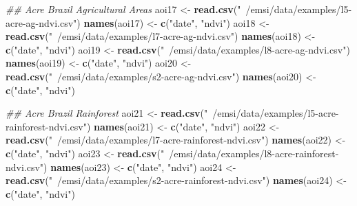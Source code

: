 \documentclass[
]{article}
\newenvironment{Shaded}{\begin{snugshade}}{\end{snugshade}}
\newcommand{\CommentTok}[1]{\textcolor[rgb]{0.56,0.35,0.01}{\textit{#1}}}
\newcommand{\KeywordTok}[1]{\textcolor[rgb]{0.13,0.29,0.53}{\textbf{#1}}}
\newcommand{\NormalTok}[1]{#1}
\newcommand{\StringTok}[1]{\textcolor[rgb]{0.31,0.60,0.02}{#1}}
\begin{document}
\begin{Shaded}
\begin{Highlighting}[]
\CommentTok{## Acre Brazil Agricultural Areas}
\NormalTok{aoi17 <-}\StringTok{ }\KeywordTok{read.csv}\NormalTok{(}\StringTok{"~/emsi/data/examples/l5-acre-ag-ndvi.csv"}\NormalTok{)}
\KeywordTok{names}\NormalTok{(aoi17) <-}\StringTok{ }\KeywordTok{c}\NormalTok{(}\StringTok{"date"}\NormalTok{, }\StringTok{"ndvi"}\NormalTok{)}
\NormalTok{aoi18 <-}\StringTok{ }\KeywordTok{read.csv}\NormalTok{(}\StringTok{"~/emsi/data/examples/l7-acre-ag-ndvi.csv"}\NormalTok{)}
\KeywordTok{names}\NormalTok{(aoi18) <-}\StringTok{ }\KeywordTok{c}\NormalTok{(}\StringTok{"date"}\NormalTok{, }\StringTok{"ndvi"}\NormalTok{)}
\NormalTok{aoi19 <-}\StringTok{ }\KeywordTok{read.csv}\NormalTok{(}\StringTok{"~/emsi/data/examples/l8-acre-ag-ndvi.csv"}\NormalTok{)}
\KeywordTok{names}\NormalTok{(aoi19) <-}\StringTok{ }\KeywordTok{c}\NormalTok{(}\StringTok{"date"}\NormalTok{, }\StringTok{"ndvi"}\NormalTok{)}
\NormalTok{aoi20 <-}\StringTok{ }\KeywordTok{read.csv}\NormalTok{(}\StringTok{"~/emsi/data/examples/s2-acre-ag-ndvi.csv"}\NormalTok{)}
\KeywordTok{names}\NormalTok{(aoi20) <-}\StringTok{ }\KeywordTok{c}\NormalTok{(}\StringTok{"date"}\NormalTok{, }\StringTok{"ndvi"}\NormalTok{)}

\CommentTok{## Acre Brazil Rainforest}
\NormalTok{aoi21 <-}\StringTok{ }\KeywordTok{read.csv}\NormalTok{(}\StringTok{"~/emsi/data/examples/l5-acre-rainforest-ndvi.csv"}\NormalTok{)}
\KeywordTok{names}\NormalTok{(aoi21) <-}\StringTok{ }\KeywordTok{c}\NormalTok{(}\StringTok{"date"}\NormalTok{, }\StringTok{"ndvi"}\NormalTok{)}
\NormalTok{aoi22 <-}\StringTok{ }\KeywordTok{read.csv}\NormalTok{(}\StringTok{"~/emsi/data/examples/l7-acre-rainforest-ndvi.csv"}\NormalTok{)}
\KeywordTok{names}\NormalTok{(aoi22) <-}\StringTok{ }\KeywordTok{c}\NormalTok{(}\StringTok{"date"}\NormalTok{, }\StringTok{"ndvi"}\NormalTok{)}
\NormalTok{aoi23 <-}\StringTok{ }\KeywordTok{read.csv}\NormalTok{(}\StringTok{"~/emsi/data/examples/l8-acre-rainforest-ndvi.csv"}\NormalTok{)}
\KeywordTok{names}\NormalTok{(aoi23) <-}\StringTok{ }\KeywordTok{c}\NormalTok{(}\StringTok{"date"}\NormalTok{, }\StringTok{"ndvi"}\NormalTok{)}
\NormalTok{aoi24 <-}\StringTok{ }\KeywordTok{read.csv}\NormalTok{(}\StringTok{"~/emsi/data/examples/s2-acre-rainforest-ndvi.csv"}\NormalTok{)}
\KeywordTok{names}\NormalTok{(aoi24) <-}\StringTok{ }\KeywordTok{c}\NormalTok{(}\StringTok{"date"}\NormalTok{, }\StringTok{"ndvi"}\NormalTok{)}


\end{Highlighting}
\end{Shaded}
\end{document}
